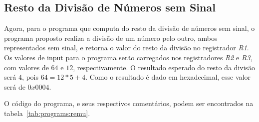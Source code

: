 \documentclass[12pt]{article}
\begin{document}
\subsection{Resto da Divisão de Números sem Sinal}\label{sec:programs:remu}

Agora, para o programa que computa do resto da divisão de números sem sinal, o
programa proposto realiza a divisão de um número pelo outro, ambos representados
sem sinal, e retorna o valor do resto da divisão no registrador \emph{R1}. Os
valores de input para o programa serão carregados nos registradores \emph{R2} e
\emph{R3}, com valores de $64$ e $12$, respectivamente. O resultado esperado do
resto da divisão será $4$, pois $64 = 12 * 5 + 4$. Como o resultado é dado em
hexadecimal, esse valor será de $0x0004$.

O código do programa, e seus respectivos comentários, podem ser encontrados na
tabela~\ref{tab:programs:remu}.
\end{document}
